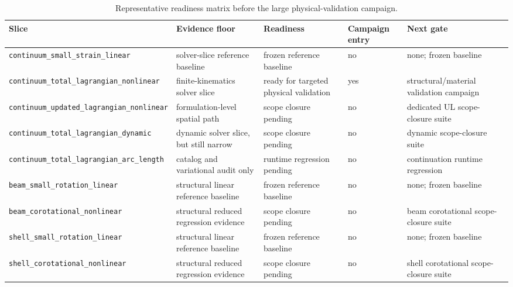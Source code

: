 \begin{table}[htbp]
  \centering
  \caption{Representative readiness matrix before the large physical-validation
  campaign.}
  \label{tab:stage1-validation-readiness}
  \scriptsize
  \setlength{\tabcolsep}{3pt}
  \begin{tabularx}{\textwidth}{@{}p{}p{}p{}p{}X@{}}
    \toprule
    \textbf{Slice} & \textbf{Evidence floor} & \textbf{Readiness}
    & \textbf{Campaign entry} & \textbf{Next gate} \\
    \midrule
    \texttt{continuum\_small\_strain\_linear}
    & solver-slice reference baseline
    & frozen reference baseline
    & no
    & none; frozen baseline \\[0.5mm]

    \texttt{continuum\_total\_lagrangian\_nonlinear}
    & finite-kinematics solver slice
    & ready for targeted physical validation
    & yes
    & structural/material validation campaign \\[0.5mm]

    \texttt{continuum\_updated\_lagrangian\_nonlinear}
    & formulation-level spatial path
    & scope closure pending
    & no
    & dedicated UL scope-closure suite \\[0.5mm]

    \texttt{continuum\_total\_lagrangian\_dynamic}
    & dynamic solver slice, but still narrow
    & scope closure pending
    & no
    & dynamic scope-closure suite \\[0.5mm]

    \texttt{continuum\_total\_lagrangian\_arc\_length}
    & catalog and variational audit only
    & runtime regression pending
    & no
    & continuation runtime regression \\[0.5mm]

    \texttt{beam\_small\_rotation\_linear}
    & structural linear reference baseline
    & frozen reference baseline
    & no
    & none; frozen baseline \\[0.5mm]

    \texttt{beam\_corotational\_nonlinear}
    & structural reduced regression evidence
    & scope closure pending
    & no
    & beam corotational scope-closure suite \\[0.5mm]

    \texttt{shell\_small\_rotation\_linear}
    & structural linear reference baseline
    & frozen reference baseline
    & no
    & none; frozen baseline \\[0.5mm]

    \texttt{shell\_corotational\_nonlinear}
    & structural reduced regression evidence
    & scope closure pending
    & no
    & shell corotational scope-closure suite \\
    \bottomrule
  \end{tabularx}
\end{table}

